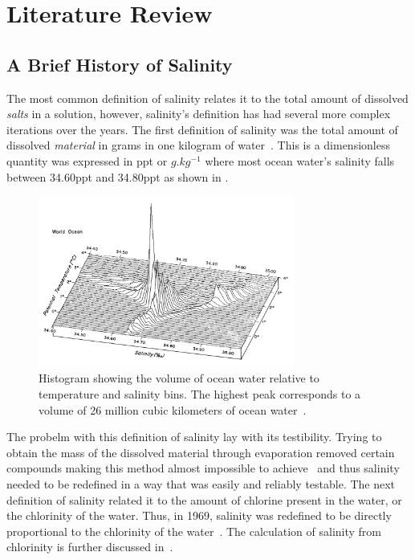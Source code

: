 
\chapter{Literature Review}\label{ch:literature}

\section{A Brief History of Salinity}\label{sec:a-brief-history-of-salinity}
The most common definition of salinity relates it to the total amount of dissolved \textit{salts} in a solution, however, salinity's definition has had several more complex iterations over the years.
The first definition of salinity was the total amount of dissolved \textit{material} in grams in one kilogram of water~\cite{stewart_introduction_to_physical_oceanography_2004}.
This is a dimensionless quantity was expressed in \gls{ppt} or $g.kg^{-1}$ where most ocean water's salinity falls between 34.60\gls{ppt} and 34.80\gls{ppt} as shown in .
\begin{figure}[h]
    \centering
    \includegraphics[width=0.75\textwidth]{Figures/ocean_salinity_temperature_quantity}
    \caption{Histogram showing the volume of ocean water relative to temperature and salinity bins. The highest peak corresponds to a volume of 26 million cubic kilometers of ocean water~\cite{worthington_ocean_graphs_1981}.}
    \label{fig:ocean_salinity_temperature_quantity} %
\end{figure}
The probelm with this definition of salinity lay with its testibility.
Trying to obtain the mass of the dissolved material through evaporation removed certain compounds making this method almost impossible to achieve~\cite{sverdrup_ocean_physics_and_chemistry_1942} and thus salinity needed to be redefined in a way that was easily and reliably testable.
The next definition of salinity related it to the amount of chlorine present in the water, or the chlorinity of the water.
Thus, in 1969, salinity was redefined to be directly proportional to the chlorinity of the water~\cite{stewart_introduction_to_physical_oceanography_2004}.
The calculation of salinity from chlorinity is further discussed in~.

